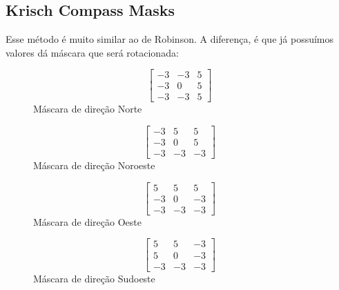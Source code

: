 \documentclass[a4paper, 12pt]{article}
\begin{document}
\subsection{Krisch Compass Masks}
Esse método é muito similar ao de Robinson. A diferença, é que já possuímos valores dá máscara que será rotacionada:

\begin{figure}[!htb]
	\begin{minipage}{.23\linewidth}
	  \centering
	  \[\left[\begin{array}{ccc}
		-3 & -3 & 5 \\
		-3 &  0 & 5 \\
		-3 & -3 & 5
	  \end{array}\right]\]
	  Máscara de direção Norte
	\end{minipage}%
	\begin{minipage}{.23\linewidth}
	  \centering
	  \[\left[\begin{array}{ccc}
		-3 &  5  &  5 \\
		-3 &  0  &  5 \\
		-3 & -3  & -3
	  \end{array}\right]\]
	  Máscara de direção Noroeste
	\end{minipage}
	\begin{minipage}{.23\linewidth}
		\centering
		\[\left[\begin{array}{ccc}
		   5 &  5  &  5 \\
		  -3 &  0  & -3 \\
		  -3 & -3  & -3
		\end{array}\right]\]
		Máscara de direção Oeste
	  \end{minipage}
	  \begin{minipage}{.23\linewidth}
		\centering
		\[\left[\begin{array}{ccc}
		   5 &   5   &  -3 \\
		   5 &   0   &  -3 \\
		  -3 &  -3   &  -3
		\end{array}\right]\]
		Máscara de direção Sudoeste
	  \end{minipage}
\end{figure}
\end{document}

